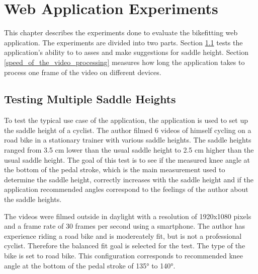 

\chapter{Web Application Experiments}
\label{experiments}

This chapter describes the experiments done to evaluate the bikefitting web application. The experiments are divided into two parts. Section \ref{assesment_of_multiple_saddle_heights} tests the application's ability to to asses and make suggestions for saddle height. Section \ref{speed_of_the_video_processing} measures how long the application takes to process one frame of the video on different devices.

\section{Testing Multiple Saddle Heights}
\label{assesment_of_multiple_saddle_heights}
To test the typical use case of the application, the application is used to set up the saddle height of a cyclist. The author filmed 6 videos of himself cycling on a road bike in a stationary trainer with various saddle heights. The saddle heights ranged from 3.5 cm lower than the usual saddle height to 2.5 cm higher than the usual saddle height. The goal of this test is to see if the measured knee angle at the bottom of the pedal stroke, which is the main measurement used to determine the saddle height, correctly increases with the saddle height and if the application recommended angles correspond to the feelings of the author about the saddle heights.

The videos were filmed outside in daylight with a resolution of 1920x1080 pixels and a frame rate of 30 frames per second using a smartphone. The author has experience riding a road bike and is modereately fit, but is not a professional cyclist. Therefore the balanced fit goal is selected for the test. The type of the bike is set to road bike. This configuration corresponds to recommended knee angle at the bottom of the pedal stroke of 135° to 140°.




